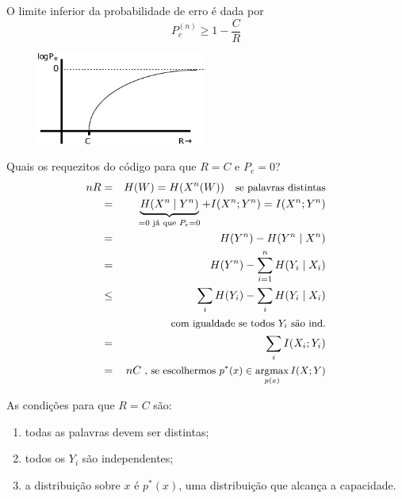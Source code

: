 \begin{frame}[allowframebreaks]
  \framebreak

  O limite inferior da probabilidade de erro é dada por
  \begin{equation}
  P_e^{(n)} \geq 1 - \frac{C}{R}
  \end{equation}

                \begin{figure}[h!]
                \centering
                \includegraphics[width=0.5\textwidth]{images/logPe-vs-R.pdf}
                \label{fig:logPe-vs-R}
                \end{figure}

  \framebreak

  Quais os requezitos do código para que $R=C$ e $P_e = 0$?
  \begin{eqnarray}
  nR &=& H(W) = H(X^n(W)) \quad \text{\small se palavras distintas} \nonumber \\
	&=& \underbrace{H(X^n \mid Y^n)}_{=0 \text{ já que }P_e =0} + I(X^n;Y^n) = I(X^n;Y^n) \nonumber \\
	&=& H(Y^n) - H(Y^n \mid X^n) \nonumber \\
	&=& H(Y^n) - \sum_{i=1}^{n} H(Y_i \mid X_i) \nonumber \\
	&\leq& \sum_i H(Y_i) - \sum_i H(Y_i \mid X_i) \nonumber \\
	&& \text{\small com igualdade se todos $Y_i$ são ind.} \nonumber \\
	&=& \sum_i I(X_i;Y_i) \nonumber \\
	&=& nC \text{\small \ , se escolhermos $p^\ast(x) \in \operatorname*{\arg\!\max}_{p(x)} I(X;Y)$}
  \end{eqnarray}

  \framebreak

  As condições para que $R=C$ são:
  \begin{enumerate}
  \item todas as palavras devem ser distintas;
  \item todos os $Y_i$ são independentes;
  \item a distribuição sobre $x$ é $p^\ast(x)$, uma distribuição que alcança a capacidade.
  \end{enumerate} 

\end{frame}


